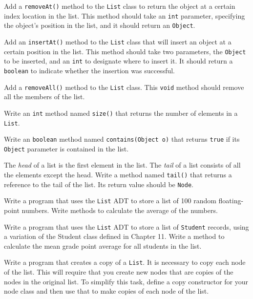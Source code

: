 \begin{EXRtwo}
\item  Add a {\tt removeAt()} method to the {\tt List} class to
return the object at a certain index location in the list.  This method
should take an {\tt int} parameter, specifying the object's position
in the list, and it should return an {\tt Object}.

\item  Add an {\tt insertAt()} method to the {\tt List} class that
will insert an object at a certain position in the list.  This method
should take two parameters, the {\tt Object} to be inserted, and an
{\tt int} to designate where to insert it.   It should return a
{\tt boolean} to indicate whether the insertion was successful.


\item  Add a {\tt removeAll()} method to the {\tt List} class.
This {\tt void} method should remove all the members of the list.

\item  Write an {\tt int}  method named {\tt size()} that returns the
number of elements in a {\tt List}.

\item  Write an {\tt boolean}  method named {\tt contains(Object o)} 
that returns
{\tt true} if its {\tt Object} parameter is contained in the list.

\item  The {\it head} of a list is the first element in the list.
The {\it tail} of a list consists of all the elements except the
head.  Write a method named {\tt tail()} that returns a reference to
the tail of the list.  Its return value should be {\tt Node}.

\item  Write a program that uses the {\tt List} ADT
to store a list of 100 random floating-point numbers.   Write methods
to calculate the average of the numbers.

\item  Write a program that uses the {\tt List} ADT
to store a list of {\tt Student} records, using a variation of the Student
class defined in Chapter 11.  Write a method to calculate the mean
grade point average for all students in the list.

\item  Write a program that creates a copy of a {\tt List}.
It is necessary to copy each node of the list.  This will require that
you create new nodes that are copies of the nodes in the original
list.  To simplify this task, define a copy constructor for your node
class and then use that to make copies of each node of the list.


\end{EXRtwo}
